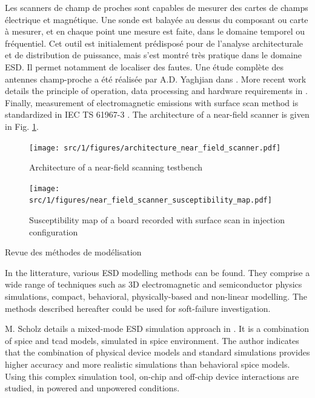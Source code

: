 Les scanners de champ de proches sont capables de mesurer des cartes de champs électrique et magnétique.
Une sonde est balayée au dessus du composant ou carte à mesurer, et en chaque point une mesure est faite, dans le domaine temporel ou fréquentiel.
Cet outil est initialement prédisposé pour de l'analyse architecturale et de distribution de puissance, mais s'est montré très pratique dans le domaine ESD.
Il permet notamment de localiser des fautes.
Une étude complète des antennes champ-proche a été réalisée par A.D. Yaghjian dans \cite{nfsFirstStudy}.
More recent work details the principle of operation, data processing and hardware requirements in \cite{near-field-scan, planarNFSAntenna, NFSMeasurements, NFScanner}.
Finally, measurement of electromagnetic emissions with surface scan method is standardized in IEC TS 61967-3 \cite{iec61967}.
The architecture of a near-field scanner is given in Fig. \ref{fig:near-field-scanner}.

\begin{figure}[!h]
  \centering
  \texttt{[image: src/1/figures/architecture\_near\_field\_scanner.pdf]}
  \caption{Architecture of a near-field scanning testbench}
  \label{fig:near-field-scanner}
\end{figure}

\begin{figure}[!h]
  \centering
  \texttt{[image: src/1/figures/near\_field\_scanner\_susceptibility\_map.pdf]}
  \caption{Susceptibility map of a board recorded with surface scan in injection configuration \cite{}}
  \label{fig:near-field-scan-map}
\end{figure}

Revue des méthodes de modélisation

In the litterature, various ESD modelling methods can be found.
They comprise a wide range of techniques such as 3D electromagnetic and semiconductor physics simulations, compact, behavioral, physically-based and non-linear modelling.
The methods described hereafter could be used for soft-failure investigation.

M. Scholz details a mixed-mode ESD simulation approach in \cite{mixedModeESDSims}.
It is a combination of \gls{spice} and \gls{tcad} models, simulated in \gls{spice} environment.
The author indicates that the combination of physical device models and standard simulations provides higher accuracy and more realistic simulations than behavioral \gls{spice} models.
Using this complex simulation tool, on-chip and off-chip device interactions are studied, in powered and unpowered conditions.

